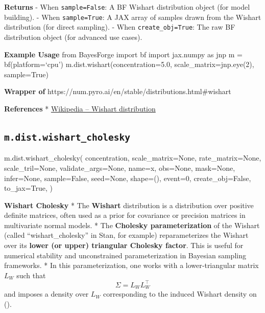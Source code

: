 \documentclass[
  letterpaper,
  DIV=11,
  numbers=noendperiod]{scrartcl}
\newenvironment{Shaded}{\begin{snugshade}}{\end{snugshade}}
\newcommand{\DecValTok}[1]{\textcolor[rgb]{0.68,0.00,0.00}{#1}}
\newcommand{\NormalTok}[1]{\textcolor[rgb]{0.00,0.23,0.31}{#1}}
\newcommand{\OperatorTok}[1]{\textcolor[rgb]{0.37,0.37,0.37}{#1}}
\newcommand{\StringTok}[1]{\textcolor[rgb]{0.13,0.47,0.30}{#1}}
\newcommand{\VariableTok}[1]{\textcolor[rgb]{0.07,0.07,0.07}{#1}}
\begin{document}
\textbf{Returns} - When \texttt{sample=False}: A BF Wishart distribution
object (for model building). - When \texttt{sample=True}: A JAX array of
samples drawn from the Wishart distribution (for direct sampling). -
When \texttt{create\_obj=True}: The raw BF distribution object (for
advanced use cases).

\textbf{Example Usage} from BayesForge import bf import jax.numpy as jnp
m = bf(platform=`cpu') m.dist.wishart(concentration=5.0,
scale\_matrix=jnp.eye(2), sample=True)

\textbf{Wrapper of}
https://num.pyro.ai/en/stable/distributions.html\#wishart

\textbf{References} *
\href{https://en.wikipedia.org/wiki/Wishart_distribution}{Wikipedia --
Wishart distribution}

\subsection{\texorpdfstring{\texttt{m.dist.wishart\_cholesky}}{m.dist.wishart\_cholesky}}\label{wishart_cholesky}

\begin{Shaded}
\begin{Highlighting}[]
\NormalTok{m.dist.wishart\_cholesky(}
\NormalTok{    concentration,}
\NormalTok{    scale\_matrix}\OperatorTok{=}\VariableTok{None}\NormalTok{,}
\NormalTok{    rate\_matrix}\OperatorTok{=}\VariableTok{None}\NormalTok{,}
\NormalTok{    scale\_tril}\OperatorTok{=}\VariableTok{None}\NormalTok{,}
\NormalTok{    validate\_args}\OperatorTok{=}\VariableTok{None}\NormalTok{,}
\NormalTok{    name}\OperatorTok{=}\StringTok{\textquotesingle{}x\textquotesingle{}}\NormalTok{,}
\NormalTok{    obs}\OperatorTok{=}\VariableTok{None}\NormalTok{,}
\NormalTok{    mask}\OperatorTok{=}\VariableTok{None}\NormalTok{,}
\NormalTok{    infer}\OperatorTok{=}\VariableTok{None}\NormalTok{,}
\NormalTok{    sample}\OperatorTok{=}\VariableTok{False}\NormalTok{,}
\NormalTok{    seed}\OperatorTok{=}\VariableTok{None}\NormalTok{,}
\NormalTok{    shape}\OperatorTok{=}\NormalTok{(),}
\NormalTok{    event}\OperatorTok{=}\DecValTok{0}\NormalTok{,}
\NormalTok{    create\_obj}\OperatorTok{=}\VariableTok{False}\NormalTok{,}
\NormalTok{    to\_jax}\OperatorTok{=}\VariableTok{True}\NormalTok{,}
\NormalTok{)}
\end{Highlighting}
\end{Shaded}

\textbf{Wishart Cholesky} * The \textbf{Wishart} distribution is a
distribution over positive definite matrices, often used as a prior for
covariance or precision matrices in multivariate normal models. * The
\textbf{Cholesky parameterization} of the Wishart (called
``wishart\_cholesky'' in Stan, for example) reparameterizes the Wishart
over its \textbf{lower (or upper) triangular Cholesky factor}. This is
useful for numerical stability and unconstrained parameterization in
Bayesian sampling frameworks. * In this parameterization, one works with
a lower‐triangular matrix \(L_W\) such that \[
\Sigma = L_W L_W^\top
\] and imposes a density over \(L_W\) corresponding to the induced
Wishart density on (\Sigma).
\end{document}

